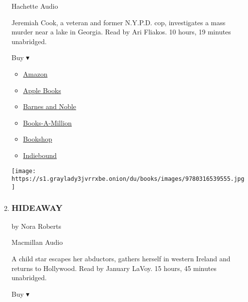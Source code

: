\begin{enumerate}
  Hachette Audio

  Jeremiah Cook, a veteran and former N.Y.P.D. cop, investigates a mass
  murder near a lake in Georgia. Read by Ari Fliakos. 10 hours, 19
  minutes unabridged.

  Buy ▾

  \begin{itemize}
  \tightlist
  \item
    \href{https://www.amazon.com/dp/0316539554?tag=NYTBSREV-20\&tag=NYTBS-20}{Amazon}
  \item
    \href{https://du-gae-books-dot-nyt-du-prd.appspot.com/buy?title=THE+SUMMER+HOUSE\&author=James+Patterson+and+Brendan+DuBois}{Apple
    Books}
  \item
    \href{https://www.anrdoezrs.net/click-7990613-11819508?url=https\%3A\%2F\%2Fwww.barnesandnoble.com\%2Fw\%2F\%3Fean\%3D9781549184468}{Barnes
    and Noble}
  \item
    \href{https://www.anrdoezrs.net/click-7990613-35140?url=https\%3A\%2F\%2Fwww.booksamillion.com\%2Fp\%2FTHE\%2BSUMMER\%2BHOUSE\%2FJames\%2BPatterson\%2Band\%2BBrendan\%2BDuBois\%2F9781549184468}{Books-A-Million}
  \item
    \href{https://bookshop.org/a/3546/9781549184468}{Bookshop}
  \item
    \href{https://www.indiebound.org/book/9781549184468?aff=NYT}{Indiebound}
  \end{itemize}

  \texttt{[image: https://s1.graylady3jvrrxbe.onion/du/books/images/9780316539555.jpg]}
\item
  \hypertarget{hideaway}{%
  \subsubsection{HIDEAWAY}\label{hideaway}}

  by Nora Roberts

  Macmillan Audio

  A child star escapes her abductors, gathers herself in western Ireland
  and returns to Hollywood. Read by January LaVoy. 15 hours, 45 minutes
  unabridged.

  Buy ▾


\end{enumerate}
